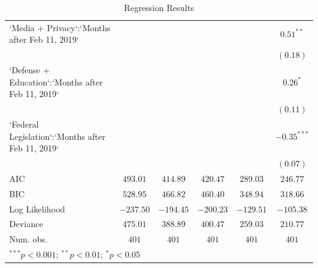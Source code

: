\begin{table}
\begin{center}
\begin{tabular}{l c c c c c}
`Media + Privacy`:`Months after Feb 11, 2019`     &              &               &               &               & $0.51^{**}$   \\
                                                  &              &               &               &               & $(0.18)$      \\
`Defense + Education`:`Months after Feb 11, 2019` &              &               &               &               & $0.26^{*}$    \\
                                                  &              &               &               &               & $(0.11)$      \\
`Federal Legislation`:`Months after Feb 11, 2019` &              &               &               &               & $-0.35^{***}$ \\
                                                  &              &               &               &               & $(0.07)$      \\
\hline
AIC                                               & $493.01$     & $414.89$      & $420.47$      & $289.03$      & $246.77$      \\
BIC                                               & $528.95$     & $466.82$      & $460.40$      & $348.94$      & $318.66$      \\
Log Likelihood                                    & $-237.50$    & $-194.45$     & $-200.23$     & $-129.51$     & $-105.38$     \\
Deviance                                          & $475.01$     & $388.89$      & $400.47$      & $259.03$      & $210.77$      \\
Num. obs.                                         & $401$        & $401$         & $401$         & $401$         & $401$         \\
\hline
\multicolumn{6}{l}{\scriptsize{$^{***}p<0.001$; $^{**}p<0.01$; $^{*}p<0.05$}}
\end{tabular}
\caption{Regression Results}
\label{table:coefficients}
\end{center}
\end{table}
